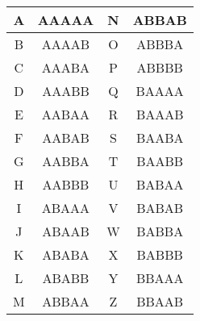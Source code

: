 
\begin{tabular}{ |c|c|c|c| } 

\hline
A & AAAAA & N & ABBAB \\
\hline
B & AAAAB & O & ABBBA \\
\hline
C & AAABA & P & ABBBB \\
\hline
D & AAABB & Q & BAAAA \\
\hline
E & AABAA & R & BAAAB \\
\hline
F & AABAB & S & BAABA \\
\hline
G & AABBA & T & BAABB \\
\hline
H & AABBB & U & BABAA \\
\hline
I & ABAAA & V & BABAB \\
\hline
J & ABAAB & W & BABBA \\
\hline
K & ABABA & X & BABBB \\
\hline
L & ABABB & Y & BBAAA \\
\hline
M & ABBAA & Z & BBAAB \\
\hline
\end{tabular}

